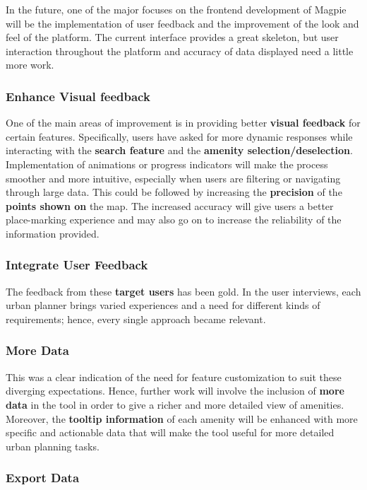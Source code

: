 In the future, one of the major focuses on the frontend development of Magpie will be the implementation of user feedback and the improvement of the look and feel of the platform. The current interface provides a great skeleton, but user interaction throughout the platform and accuracy of data displayed need a little more work.

\subsubsection{Enhance Visual feedback}

One of the main areas of improvement is in providing better \textbf{visual feedback} for certain features. Specifically, users have asked for more dynamic responses while interacting with the \textbf{search feature} and the \textbf{amenity selection/deselection}. Implementation of animations or progress indicators will make the process smoother and more intuitive, especially when users are filtering or navigating through large data. This could be followed by increasing the \textbf{precision} of the \textbf{points shown on} the map. The increased accuracy will give users a better place{-}marking experience and may also go on to increase the reliability of the information provided.

\subsubsection{Integrate User Feedback}

The feedback from these \textbf{target users} has been gold. In the user interviews, each urban planner brings varied experiences and a need for different kinds of requirements; hence, every single approach became relevant.

\subsubsection{More Data}

This was a clear indication of the need for feature customization to suit these diverging expectations. Hence, further work will involve the inclusion of \textbf{more data} in the tool in order to give a richer and more detailed view of amenities. Moreover, the \textbf{tooltip information} of each amenity will be enhanced with more specific and actionable data that will make the tool useful for more detailed urban planning tasks.

\subsubsection{Export Data}

